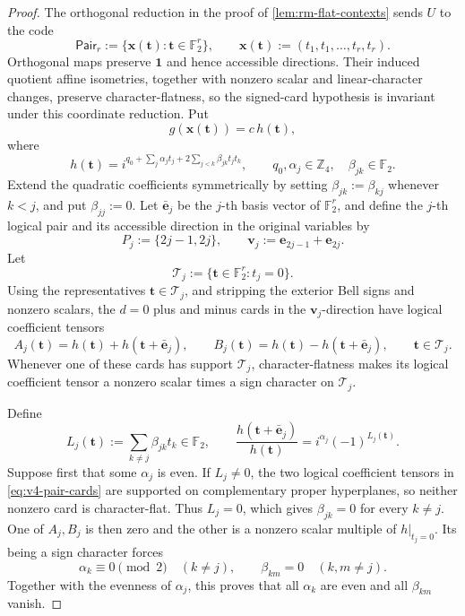\documentclass[11pt,letterpaper,onecolumn]{article}
\theoremstyle{plain}
\theoremstyle{definition}
\theoremstyle{remark}
\newcommand{\Ftwo}{\mathbb F_2}
\newcommand{\one}{\mathbf 1}
\begin{document}
\begin{proof}
The orthogonal reduction in the proof of
\cref{lem:rm-flat-contexts} sends \(U\) to the code
\[
 \mathsf{Pair}_r
 :=\{{\mathbf x}({\mathbf{t}}):{\mathbf{t}}\in\Ftwo^r\},
 \qquad
 {\mathbf x}({\mathbf{t}}):=(t_1,t_1,\ldots,t_r,t_r).
\]
Orthogonal maps preserve \(\one\) and hence accessible directions.  Their
induced quotient affine isometries, together with nonzero scalar and
linear-character changes, preserve character-flatness, so the signed-card
hypothesis is invariant under this coordinate reduction.
Put
\[
 g({\mathbf x}({\mathbf{t}}))=c\,h({\mathbf{t}}),
\]
where
\begin{equation}
 h({\mathbf{t}})=i^{q_0+\sum_j\alpha_jt_j+
             2\sum_{j<k}\beta_{jk}t_jt_k},
 \qquad q_0,\alpha_j\in\mathbb Z_4,
 \quad \beta_{jk}\in\Ftwo.
 \label{eq:v4-pair-phase}
\end{equation}
Extend the quadratic coefficients symmetrically by setting
\(\beta_{jk}:=\beta_{kj}\) whenever \(k<j\), and put \(\beta_{jj}:=0\).
Let \(\bar {\mathbf{e}}_j\) be the \(j\)-th basis vector of \(\Ftwo^r\), and define
the \(j\)-th logical pair and its accessible direction in the original variables by
\[
 P_j:=\{2j-1,2j\},
 \qquad
 {\mathbf{v}}_j:={\mathbf{e}}_{2j-1}+{\mathbf{e}}_{2j}.
\]
Let
\[
 \mathcal T_j:=\{{\mathbf{t}}\in\Ftwo^r:t_j=0\}.
\]
Using the representatives \({\mathbf{t}}\in\mathcal T_j\), and stripping the exterior
Bell signs and nonzero scalars, the \(d=0\) plus and minus cards
in the \({\mathbf{v}}_j\)-direction have logical coefficient tensors
\begin{equation}
 A_j({\mathbf{t}})=h({\mathbf{t}})+h({\mathbf{t}}+\bar {\mathbf{e}}_j),
 \qquad B_j({\mathbf{t}})=h({\mathbf{t}})-h({\mathbf{t}}+\bar {\mathbf{e}}_j),
 \qquad {\mathbf{t}}\in\mathcal T_j.
 \label{eq:v4-pair-cards}
\end{equation}
Whenever one of these cards has support \(\mathcal T_j\),
character-flatness makes its logical coefficient tensor a nonzero scalar times
a sign character on \(\mathcal T_j\).

Define
\[
 L_j({\mathbf{t}}):=\sum_{k\ne j}\beta_{jk}t_k\in\Ftwo,
 \qquad
 \frac{h({\mathbf{t}}+\bar {\mathbf{e}}_j)}{h({\mathbf{t}})}=i^{\alpha_j}(-1)^{L_j({\mathbf{t}})}.
\]
Suppose first that some \(\alpha_j\) is even.  If \(L_j\ne0\), the two
logical coefficient tensors in \cref{eq:v4-pair-cards} are supported on complementary proper
hyperplanes, so neither nonzero card is character-flat.  Thus \(L_j=0\),
which gives \(\beta_{jk}=0\) for every \(k\ne j\).  One of \(A_j,B_j\) is
then zero and the other is a nonzero scalar multiple of
\(h|_{t_j=0}\).  Its being a sign character forces
\[
 \alpha_k\equiv0\pmod2\quad(k\ne j),
 \qquad \beta_{km}=0\quad(k,m\ne j).
\]
Together with the evenness of \(\alpha_j\), this proves that all
\(\alpha_k\) are even and all \(\beta_{km}\) vanish.


\end{proof}
\end{document}
